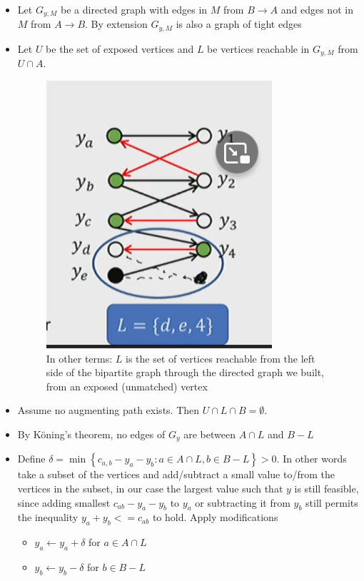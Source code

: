 \documentclass[../notes.tex]{subfiles}
\begin{document}
\begin{itemize}
    \item Let $ G_{y, M} $ be a directed graph with edges in $ M $ from $ B \to A $ and edges not in $ M $ from $ A \to B $. By extension $ G_{y, M} $ is also a graph of tight edges
    \item Let $ U $ be the set of exposed vertices and $ L $ be vertices reachable in $ G_{y, M} $ from $ U \cap A$. 
        \begin{figure}[H]
            \centering
            \includegraphics[width=0.8\linewidth]{img/image_2023-04-06-04-28-29.png}
            \caption{In other terms: $ L $ is the set of vertices reachable from the left side of the bipartite graph through the directed graph we built, from an exposed (unmatched) vertex}
        \end{figure}

    \item Assume no augmenting path exists. Then $ U \cap L \cap B  = \emptyset $. 
    \item By K\"oning's theorem, no edges of $ G_y $ are between $ A \cap L $ and $  B - L $
    \item Define $ \delta = \min \left\{ c_{a,b} - y_a - y_b: a \in A \cap L, b \in B - L \right\} > 0  $. In other words take a subset of the vertices and add/subtract a small value to/from the vertices in the subset, in our case the largest value such that $ y $ is still feasible, since adding smallest $ c_{ab} - y_a - y_b $ to $ y_a $ or subtracting it from $ y_b $ still permits the inequality $ y_a + y_b <= c_{ab} $ to hold.
        Apply modifications

        \begin{itemize}
            \item $ y_a \leftarrow y_a + \delta $ for $ a \in A \cap L $
            \item $ y_b \leftarrow y_b - \delta $ for $ b \in B - L $
        \end{itemize}
\end{itemize}
\end{document}
